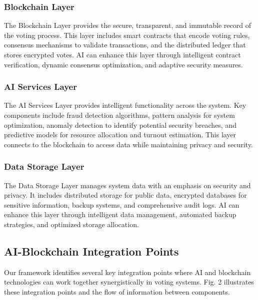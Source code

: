 \documentclass[conference]{IEEEtran}
\begin{document}
\subsubsection{Blockchain Layer}
The Blockchain Layer provides the secure, transparent, and immutable record of the voting process. This layer includes smart contracts that encode voting rules, consensus mechanisms to validate transactions, and the distributed ledger that stores encrypted votes. AI can enhance this layer through intelligent contract verification, dynamic consensus optimization, and adaptive security measures.

\subsubsection{AI Services Layer}
The AI Services Layer provides intelligent functionality across the system. Key components include fraud detection algorithms, pattern analysis for system optimization, anomaly detection to identify potential security breaches, and predictive models for resource allocation and turnout estimation. This layer connects to the blockchain to access data while maintaining privacy and security.

\subsubsection{Data Storage Layer}
The Data Storage Layer manages system data with an emphasis on security and privacy. It includes distributed storage for public data, encrypted databases for sensitive information, backup systems, and comprehensive audit logs. AI can enhance this layer through intelligent data management, automated backup strategies, and optimized storage allocation.

\subsection{AI-Blockchain Integration Points}
Our framework identifies several key integration points where AI and blockchain technologies can work together synergistically in voting systems. Fig. 2 illustrates these integration points and the flow of information between components.
\end{document}
